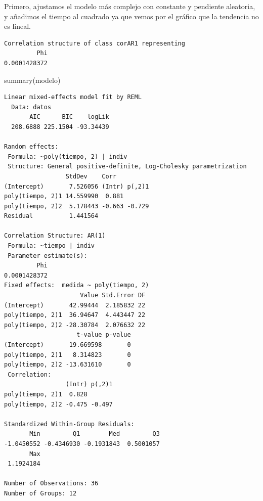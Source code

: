 \documentclass[
]{book}
\newenvironment{Shaded}{\begin{snugshade}}{\end{snugshade}}
\newcommand{\AttributeTok}[1]{\textcolor[rgb]{0.77,0.63,0.00}{#1}}
\newcommand{\DecValTok}[1]{\textcolor[rgb]{0.00,0.00,0.81}{#1}}
\newcommand{\FunctionTok}[1]{\textcolor[rgb]{0.00,0.00,0.00}{#1}}
\newcommand{\NormalTok}[1]{#1}
\newcommand{\OtherTok}[1]{\textcolor[rgb]{0.56,0.35,0.01}{#1}}
\newcommand{\SpecialCharTok}[1]{\textcolor[rgb]{0.00,0.00,0.00}{#1}}
\begin{document}
Primero, ajustamos el modelo más complejo con constante y pendiente aleatoria, y añadimos el tiempo al cuadrado ya que vemos por el gráfico que la tendencia no es lineal.

\begin{Shaded}
\end{Shaded}

\begin{verbatim}
Correlation structure of class corAR1 representing
         Phi 
0.0001428372 
\end{verbatim}

\begin{Shaded}
\begin{Highlighting}[]
\FunctionTok{summary}\NormalTok{(modelo)}
\end{Highlighting}
\end{Shaded}

\begin{verbatim}
Linear mixed-effects model fit by REML
  Data: datos 
       AIC      BIC    logLik
  208.6888 225.1504 -93.34439

Random effects:
 Formula: ~poly(tiempo, 2) | indiv
 Structure: General positive-definite, Log-Cholesky parametrization
                 StdDev    Corr         
(Intercept)       7.526056 (Intr) p(,2)1
poly(tiempo, 2)1 14.559990  0.881       
poly(tiempo, 2)2  5.178443 -0.663 -0.729
Residual          1.441564              

Correlation Structure: AR(1)
 Formula: ~tiempo | indiv 
 Parameter estimate(s):
         Phi 
0.0001428372 
Fixed effects:  medida ~ poly(tiempo, 2) 
                     Value Std.Error DF
(Intercept)       42.99444  2.185832 22
poly(tiempo, 2)1  36.94647  4.443447 22
poly(tiempo, 2)2 -28.30784  2.076632 22
                    t-value p-value
(Intercept)       19.669598       0
poly(tiempo, 2)1   8.314823       0
poly(tiempo, 2)2 -13.631610       0
 Correlation: 
                 (Intr) p(,2)1
poly(tiempo, 2)1  0.828       
poly(tiempo, 2)2 -0.475 -0.497

Standardized Within-Group Residuals:
       Min         Q1        Med         Q3 
-1.0450552 -0.4346930 -0.1931843  0.5001057 
       Max 
 1.1924184 

Number of Observations: 36
Number of Groups: 12 
\end{verbatim}
\end{document}
